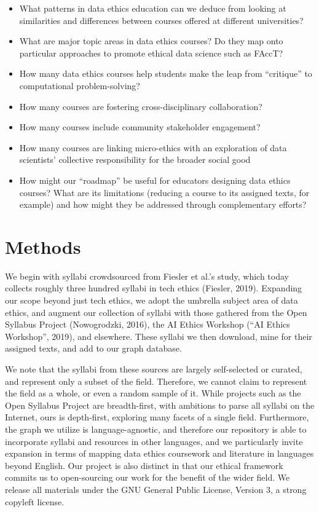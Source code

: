 \documentclass[
]{article}
\providecommand{\tightlist}{%
  \setlength{\itemsep}{0pt}\setlength{\parskip}{0pt}}
\begin{document}
\begin{itemize}
\tightlist
\item
  What patterns in data ethics education can we deduce from looking at
  similarities and differences between courses offered at different
  universities?
\item
  What are major topic areas in data ethics courses? Do they map onto
  particular approaches to promote ethical data science such as FAccT?
\item
  How many data ethics courses help students make the leap from
  ``critique'' to computational problem-solving?
\item
  How many courses are fostering cross-disciplinary collaboration?
\item
  How many courses include community stakeholder engagement?
\item
  How many courses are linking micro-ethics with an exploration of data
  scientists' collective responsibility for the broader social good
\item
  How might our ``roadmap'' be useful for educators designing data
  ethics courses? What are its limitations (reducing a course to its
  assigned texts, for example) and how might they be addressed through
  complementary efforts?
\end{itemize}

\hypertarget{methods}{%
\section{Methods}\label{methods}}

We begin with syllabi crowdsourced from Fiesler et al.'s study, which
today collects roughly three hundred syllabi in tech ethics (Fiesler,
2019). Expanding our scope beyond just tech ethics, we adopt the
umbrella subject area of data ethics, and augment our collection of
syllabi with those gathered from the Open Syllabus Project (Nowogrodzki,
2016), the AI Ethics Workshop ({``{AI} {Ethics} {Workshop}''}, 2019),
and elsewhere. These syllabi we then download, mine for their assigned
texts, and add to our graph database.

We note that the syllabi from these sources are largely self-selected or
curated, and represent only a subset of the field. Therefore, we cannot
claim to represent the field as a whole, or even a random sample of it.
While projects such as the Open Syllabus Project are breadth-first, with
ambitions to parse all syllabi on the Internet, ours is depth-first,
exploring many facets of a single field. Furthermore, the graph we
utilize is language-agnostic, and therefore our repository is able to
incorporate syllabi and resources in other languages, and we
particularly invite expansion in terms of mapping data ethics coursework
and literature in languages beyond English. Our project is also distinct
in that our ethical framework commits us to open-sourcing our work for
the benefit of the wider field. We release all materials under the GNU
General Public License, Version 3, a strong copyleft license.
\end{document}
